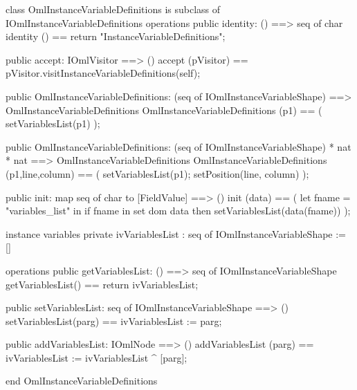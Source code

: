 \begin{vdm_al}
class OmlInstanceVariableDefinitions is subclass of IOmlInstanceVariableDefinitions
operations
  public identity: () ==> seq of char
  identity () == return "InstanceVariableDefinitions";

  public accept: IOmlVisitor ==> ()
  accept (pVisitor) == pVisitor.visitInstanceVariableDefinitions(self);

  public OmlInstanceVariableDefinitions:
    (seq of IOmlInstanceVariableShape) ==> OmlInstanceVariableDefinitions
  OmlInstanceVariableDefinitions (p1) == 
    ( setVariablesList(p1) );

  public OmlInstanceVariableDefinitions:
    (seq of IOmlInstanceVariableShape) *
    nat *
    nat ==> OmlInstanceVariableDefinitions
  OmlInstanceVariableDefinitions (p1,line,column) == 
    ( setVariablesList(p1);
      setPosition(line, column) );

  public init: map seq of char to [FieldValue] ==> ()
  init (data) ==
    ( let fname = "variables_list" in
        if fname in set dom data
        then setVariablesList(data(fname)) );

instance variables
  private ivVariablesList : seq of IOmlInstanceVariableShape := []

operations
  public getVariablesList: () ==> seq of IOmlInstanceVariableShape
  getVariablesList() == return ivVariablesList;

  public setVariablesList: seq of IOmlInstanceVariableShape ==> ()
  setVariablesList(parg) == ivVariablesList := parg;

  public addVariablesList: IOmlNode ==> ()
  addVariablesList (parg) == ivVariablesList := ivVariablesList ^ [parg];

end OmlInstanceVariableDefinitions
\end{vdm_al}

